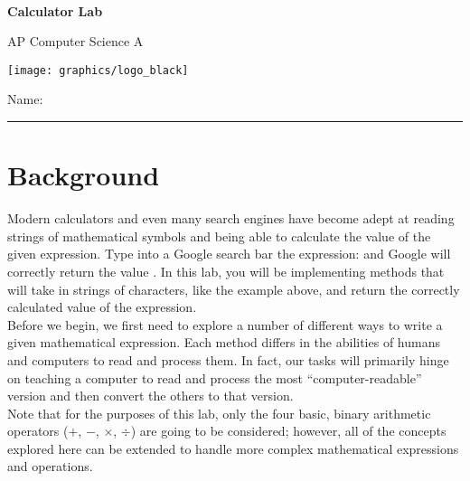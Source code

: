 
\usepackage[utf8]{inputenc}

\def\LabCourse{AP Computer Science A}
\def\LabNumber{05}
\def\LabTitle{Calculator Lab}

\newcommand\QBlankBox[1]{
\stepcounter{QuestionCounter}
	\colorbox{black!10}{\parbox{0.9875\textwidth}{
	  \raggedright
	  \textbf{Question \#\theQuestionCounter:} #1
	}}
}

\newcommand\QFilledBox[2]{
\stepcounter{QuestionCounter}
	\colorbox{black!10}{\parbox{0.9875\textwidth}{
	  \raggedright
	  \textbf{Question \#\theQuestionCounter:} #1
	}}

	\colorbox{black!5}{\parbox{0.9875\textwidth}{
		\raggedright
		#2
	}}
}


	\begin{coverpages}
		\ \\[2cm]
		\begin{center}
			\huge
			\textbf{\LabTitle}

			\Large
			\LabCourse
		\end{center}

		\vspace{1.5cm}

		\begin{center}
			\texttt{[image: graphics/logo\_black]}

			\vspace{2.5cm}

			\Large
			Name: \rule{11.5cm}{0.1pt}
		\end{center}
	\end{coverpages}

	\blankpage

	\thispagestyle{empty}
	\tableofcontents

	\pagebreak

	\section{Background}
		Modern calculators and even many search engines have become adept at reading strings of mathematical symbols and being able to calculate the value of the given expression. Type into a Google search bar the expression:  and Google will correctly return the value . In this lab, you will be implementing methods that will take in strings of characters, like the example above, and return the correctly calculated value of the expression.\\[\baselineskip]
		Before we begin, we first need to explore a number of different ways to write a given mathematical expression. Each method differs in the abilities of humans and computers to read and process them. In fact, our tasks will primarily hinge on teaching a computer to read and process the most ``computer-readable'' version and then convert the others to that version.\\[\baselineskip]
		Note that for the purposes of this lab, only the four basic, binary arithmetic operators ($+$, $-$, $\times$, $\div$) are going to be considered; however, all of the concepts explored here can be extended to handle more complex mathematical expressions and operations.

